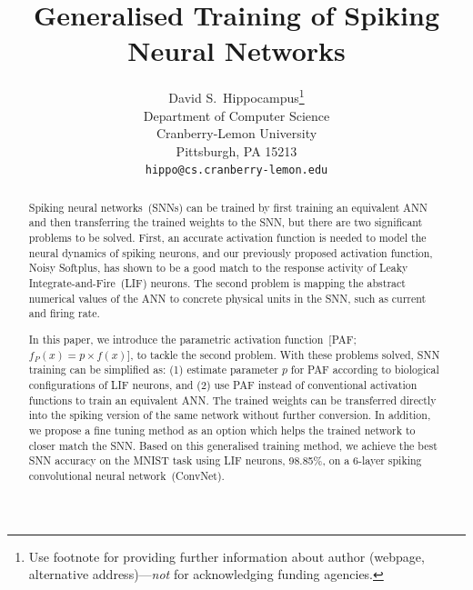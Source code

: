 \documentclass{article}
\title{Generalised Training of Spiking Neural Networks}
\author{
	David S.~Hippocampus\thanks{Use footnote for providing further
		information about author (webpage, alternative
		address)---\emph{not} for acknowledging funding agencies.} \\
	Department of Computer Science\\
	Cranberry-Lemon University\\
	Pittsburgh, PA 15213 \\
	\texttt{hippo@cs.cranberry-lemon.edu} \\
}
\begin{document}
	
	\maketitle
	
	\begin{abstract}
		Spiking neural networks~(SNNs) can be trained by first training an equivalent ANN and then transferring the trained weights to the SNN, but there are two significant problems to be solved.
		First, an accurate activation function is needed to model the neural dynamics of spiking neurons, and our previously proposed activation function, Noisy Softplus, has shown to be a good match to the response activity of Leaky Integrate-and-Fire~(LIF) neurons.
		The second problem is mapping the abstract numerical values of the ANN to concrete physical units in the SNN, such as current and firing rate.

		In this paper, we introduce the parametric activation function~[PAF; $f_{P}(x) = p \times f(x)$], to tackle the second problem.
		With these problems solved, SNN training can be simplified as: (1) estimate parameter $p$ for PAF according to biological configurations of LIF neurons, and (2) use PAF instead of conventional activation functions to train an equivalent ANN.
		The trained weights can be transferred directly into the spiking version of the same network without further conversion.
		In addition, we propose a fine tuning method as an option which helps the trained network to closer match the SNN.
		Based on this generalised training method, we achieve the best SNN accuracy on the MNIST task using LIF neurons, 98.85\%, on a 6-layer spiking convolutional neural network~(ConvNet).
		
		
		
		

\end{abstract}
\end{document}
